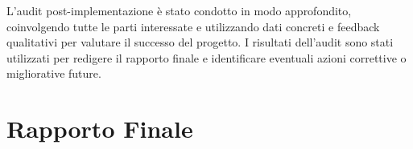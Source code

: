 L'audit post-implementazione è stato condotto in modo approfondito, coinvolgendo tutte le parti interessate e utilizzando dati concreti e feedback qualitativi per valutare il successo del progetto. I risultati dell'audit sono stati utilizzati per redigere il rapporto finale e identificare eventuali azioni correttive o migliorative future.

\section{Rapporto Finale}

